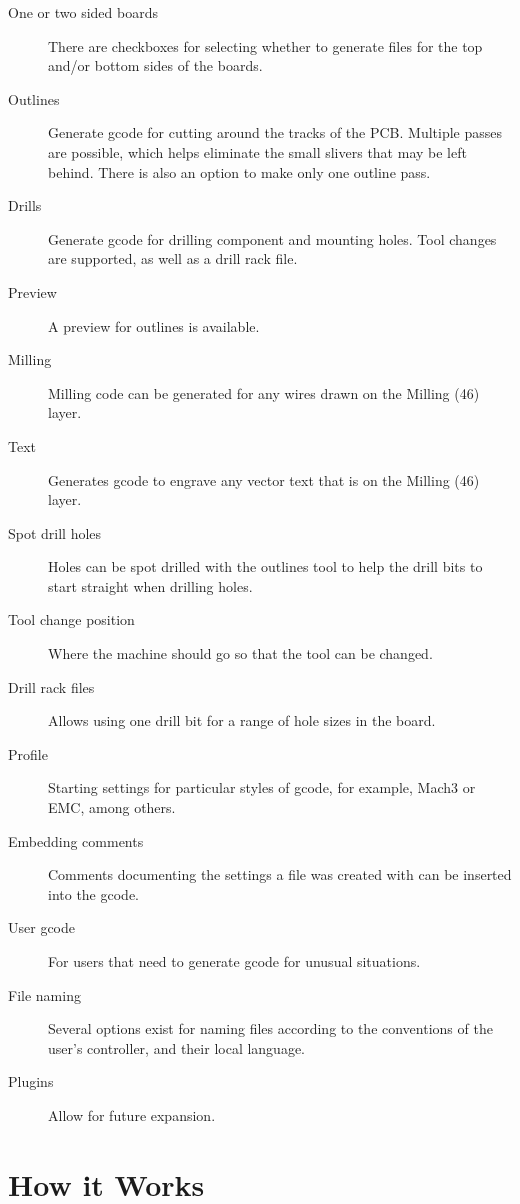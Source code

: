 \documentclass[11pt]{book}
\begin{document}
\begin{description}
	\item[One or two sided boards] There are checkboxes for selecting whether to generate files for the top and/or bottom sides of the boards.
	\item[Outlines] Generate gcode for cutting around the tracks of the PCB. Multiple passes are possible, which helps eliminate the small slivers that may be left behind. There is also an option to make only one outline pass.
	\item[Drills] Generate gcode for drilling component and mounting holes. Tool changes are supported, as well as a drill rack file.
	\item[Preview] A preview for outlines is available.
	\item[Milling] Milling code can be generated for any wires drawn on the Milling (46) layer.
	\item[Text] Generates gcode to engrave any vector text that is on the Milling (46) layer.
	\item[Spot drill holes] Holes can be spot drilled with the outlines tool to help the drill bits to start straight when drilling holes.
	\item[Tool change position] Where the machine should go so that the tool can be changed.
	\item[Drill rack files] Allows using one drill bit for a range of hole sizes in the board.
	\item[Profile] Starting settings for particular styles of gcode, for example, Mach3 or EMC, among others.
	\item[Embedding comments] Comments documenting the settings a file was created with can be inserted into the gcode.
	\item[User gcode] For users that need to generate gcode for unusual situations.
	\item[File naming] Several options exist for naming files according to the conventions of the user's controller, and their local language.
	\item[Plugins] Allow for future expansion.
\end{description}

%
%
\section{How it Works}\label{sec:HowItWorks}
\end{document}
